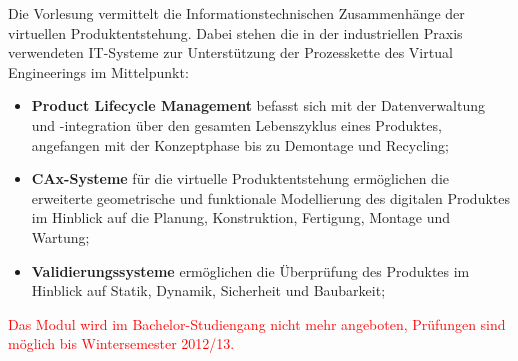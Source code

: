 \begin{module}
\begin{content}
Die Vorlesung vermittelt die Informationstechnischen Zusammenhänge der virtuellen Produktentstehung. Dabei stehen die in der industriellen Praxis verwendeten IT-Systeme zur Unterstützung der Prozesskette des Virtual Engineerings im Mittelpunkt:

 \begin{itemize}\item \textbf{Product Lifecycle Management} befasst sich mit der Datenverwaltung und -integration über den gesamten Lebenszyklus eines Produktes, angefangen mit der Konzeptphase bis zu Demontage und Recycling;   \item \textbf{CAx-Systeme} für die virtuelle Produktentstehung ermöglichen die erweiterte geometrische und funktionale Modellierung des digitalen Produktes im Hinblick auf die Planung, Konstruktion, Fertigung, Montage und Wartung;   \item \textbf{Validierungssysteme }ermöglichen die Überprüfung des Produktes im Hinblick auf Statik, Dynamik, Sicherheit und Baubarkeit;   \end{itemize}
\end{content}

\begin{remarks}\textcolor{red}{Das Modul wird im Bachelor-Studiengang nicht mehr angeboten, Prüfungen sind möglich bis Wintersemester 2012/13.}

\end{remarks}

\end{module}

